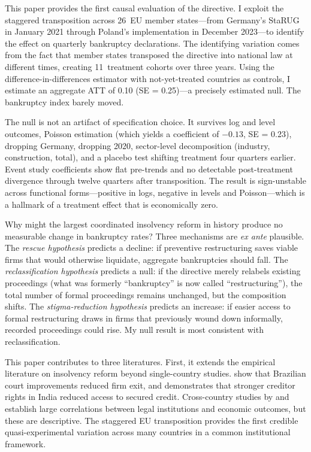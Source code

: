 \documentclass[12pt]{article}
\begin{document}
This paper provides the first causal evaluation of the directive. I exploit the staggered transposition across 26~EU member states---from Germany's StaRUG in January 2021 through Poland's implementation in December 2023---to identify the effect on quarterly bankruptcy declarations. The identifying variation comes from the fact that member states transposed the directive into national law at different times, creating 11~treatment cohorts over three years. Using the \citet{CallawayandSantAnna2021} difference-in-differences estimator with not-yet-treated countries as controls, I estimate an aggregate ATT of 0.10 (SE = 0.25)---a precisely estimated null. The bankruptcy index barely moved.

The null is not an artifact of specification choice. It survives log and level outcomes, Poisson estimation (which yields a coefficient of $-0.13$, SE = 0.23), dropping Germany, dropping 2020, sector-level decomposition (industry, construction, total), and a placebo test shifting treatment four quarters earlier. Event study coefficients show flat pre-trends and no detectable post-treatment divergence through twelve quarters after transposition. The result is sign-unstable across functional forms---positive in logs, negative in levels and Poisson---which is a hallmark of a treatment effect that is economically zero.

Why might the largest coordinated insolvency reform in history produce no measurable change in bankruptcy rates? Three mechanisms are \textit{ex ante} plausible. The \textit{rescue hypothesis} predicts a decline: if preventive restructuring saves viable firms that would otherwise liquidate, aggregate bankruptcies should fall. The \textit{reclassification hypothesis} predicts a null: if the directive merely relabels existing proceedings (what was formerly ``bankruptcy'' is now called ``restructuring''), the total number of formal proceedings remains unchanged, but the composition shifts. The \textit{stigma-reduction hypothesis} predicts an increase: if easier access to formal restructuring draws in firms that previously wound down informally, recorded proceedings could rise. My null result is most consistent with reclassification.

This paper contributes to three literatures. First, it extends the empirical literature on insolvency reform beyond single-country studies. \citet{PonticelliAlencar2016} show that Brazilian court improvements reduced firm exit, and \citet{Vig2013} demonstrates that stronger creditor rights in India reduced access to secured credit. Cross-country studies by \citet{DjankovEtAl2008} and \citet{LaPortaetal1998} establish large correlations between legal institutions and economic outcomes, but these are descriptive. The staggered EU transposition provides the first credible quasi-experimental variation across many countries in a common institutional framework.
\end{document}
